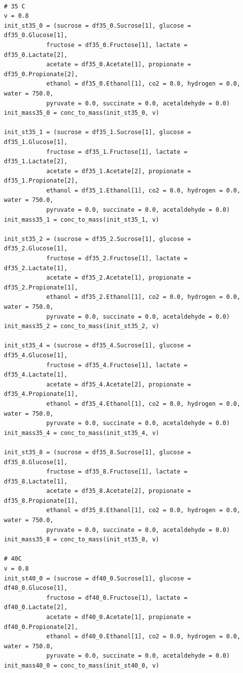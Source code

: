 \documentclass[11pt]{article}
\begin{document}
\begin{verbatim}

# 35 C
v = 0.8
init_st35_0 = (sucrose = df35_0.Sucrose[1], glucose = df35_0.Glucose[1],
            fructose = df35_0.Fructose[1], lactate = df35_0.Lactate[2],
            acetate = df35_0.Acetate[1], propionate = df35_0.Propionate[2],
            ethanol = df35_0.Ethanol[1], co2 = 0.0, hydrogen = 0.0, water = 750.0,
            pyruvate = 0.0, succinate = 0.0, acetaldehyde = 0.0)
init_mass35_0 = conc_to_mass(init_st35_0, v)

init_st35_1 = (sucrose = df35_1.Sucrose[1], glucose = df35_1.Glucose[1],
            fructose = df35_1.Fructose[1], lactate = df35_1.Lactate[2],
            acetate = df35_1.Acetate[2], propionate = df35_1.Propionate[2],
            ethanol = df35_1.Ethanol[1], co2 = 0.0, hydrogen = 0.0, water = 750.0,
            pyruvate = 0.0, succinate = 0.0, acetaldehyde = 0.0)
init_mass35_1 = conc_to_mass(init_st35_1, v)

init_st35_2 = (sucrose = df35_2.Sucrose[1], glucose = df35_2.Glucose[1],
            fructose = df35_2.Fructose[1], lactate = df35_2.Lactate[1],
            acetate = df35_2.Acetate[1], propionate = df35_2.Propionate[1],
            ethanol = df35_2.Ethanol[1], co2 = 0.0, hydrogen = 0.0, water = 750.0,
            pyruvate = 0.0, succinate = 0.0, acetaldehyde = 0.0)
init_mass35_2 = conc_to_mass(init_st35_2, v)

init_st35_4 = (sucrose = df35_4.Sucrose[1], glucose = df35_4.Glucose[1],
            fructose = df35_4.Fructose[1], lactate = df35_4.Lactate[1],
            acetate = df35_4.Acetate[2], propionate = df35_4.Propionate[1],
            ethanol = df35_4.Ethanol[1], co2 = 0.0, hydrogen = 0.0, water = 750.0,
            pyruvate = 0.0, succinate = 0.0, acetaldehyde = 0.0)
init_mass35_4 = conc_to_mass(init_st35_4, v)

init_st35_8 = (sucrose = df35_8.Sucrose[1], glucose = df35_8.Glucose[1],
            fructose = df35_8.Fructose[1], lactate = df35_8.Lactate[1],
            acetate = df35_8.Acetate[2], propionate = df35_8.Propionate[1],
            ethanol = df35_8.Ethanol[1], co2 = 0.0, hydrogen = 0.0, water = 750.0,
            pyruvate = 0.0, succinate = 0.0, acetaldehyde = 0.0)
init_mass35_8 = conc_to_mass(init_st35_8, v)

# 40C
v = 0.8
init_st40_0 = (sucrose = df40_0.Sucrose[1], glucose = df40_0.Glucose[1],
            fructose = df40_0.Fructose[1], lactate = df40_0.Lactate[2],
            acetate = df40_0.Acetate[1], propionate = df40_0.Propionate[2],
            ethanol = df40_0.Ethanol[1], co2 = 0.0, hydrogen = 0.0, water = 750.0,
            pyruvate = 0.0, succinate = 0.0, acetaldehyde = 0.0)
init_mass40_0 = conc_to_mass(init_st40_0, v)


\end{verbatim}
\end{document}
